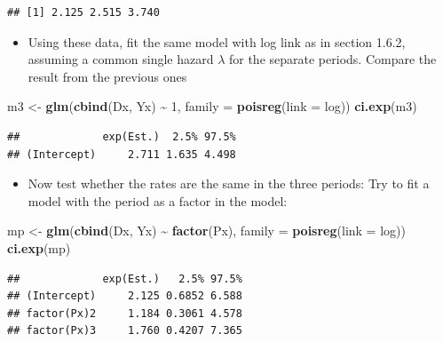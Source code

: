\documentclass[
]{book}
\newenvironment{Shaded}{\begin{snugshade}}{\end{snugshade}}
\newcommand{\AttributeTok}[1]{\textcolor[rgb]{0.13,0.29,0.53}{#1}}
\newcommand{\DecValTok}[1]{\textcolor[rgb]{0.00,0.00,0.81}{#1}}
\newcommand{\FunctionTok}[1]{\textcolor[rgb]{0.13,0.29,0.53}{\textbf{#1}}}
\newcommand{\NormalTok}[1]{#1}
\newcommand{\OtherTok}[1]{\textcolor[rgb]{0.56,0.35,0.01}{#1}}
\newcommand{\SpecialCharTok}[1]{\textcolor[rgb]{0.81,0.36,0.00}{\textbf{#1}}}
\providecommand{\tightlist}{%
  \setlength{\itemsep}{0pt}\setlength{\parskip}{0pt}}
\theoremstyle{definition}
\theoremstyle{definition}
\theoremstyle{definition}
\theoremstyle{definition}
\theoremstyle{remark}
\begin{document}
\begin{verbatim}
## [1] 2.125 2.515 3.740
\end{verbatim}

\begin{itemize}
\tightlist
\item
  Using these data,
  fit the same model with log link as in section 1.6.2, assuming a common single hazard \(\lambda\)
  for the separate periods. Compare the result from the previous ones
\end{itemize}

\begin{Shaded}
\begin{Highlighting}[]
\NormalTok{m3 }\OtherTok{\textless{}{-}} \FunctionTok{glm}\NormalTok{(}\FunctionTok{cbind}\NormalTok{(Dx, Yx) }\SpecialCharTok{\textasciitilde{}} \DecValTok{1}\NormalTok{, }\AttributeTok{family =} \FunctionTok{poisreg}\NormalTok{(}\AttributeTok{link =}\NormalTok{ log))}
\FunctionTok{ci.exp}\NormalTok{(m3)}
\end{Highlighting}
\end{Shaded}

\begin{verbatim}
##             exp(Est.)  2.5% 97.5%
## (Intercept)     2.711 1.635 4.498
\end{verbatim}

\begin{itemize}
\tightlist
\item
  Now test whether the rates are the same in the three periods:
  Try to fit a model with the period as a factor in the model:
\end{itemize}

\begin{Shaded}
\begin{Highlighting}[]
\NormalTok{mp }\OtherTok{\textless{}{-}} \FunctionTok{glm}\NormalTok{(}\FunctionTok{cbind}\NormalTok{(Dx, Yx) }\SpecialCharTok{\textasciitilde{}} \FunctionTok{factor}\NormalTok{(Px), }\AttributeTok{family =} \FunctionTok{poisreg}\NormalTok{(}\AttributeTok{link =}\NormalTok{ log))}
\FunctionTok{ci.exp}\NormalTok{(mp)}
\end{Highlighting}
\end{Shaded}

\begin{verbatim}
##             exp(Est.)   2.5% 97.5%
## (Intercept)     2.125 0.6852 6.588
## factor(Px)2     1.184 0.3061 4.578
## factor(Px)3     1.760 0.4207 7.365
\end{verbatim}
\end{document}

